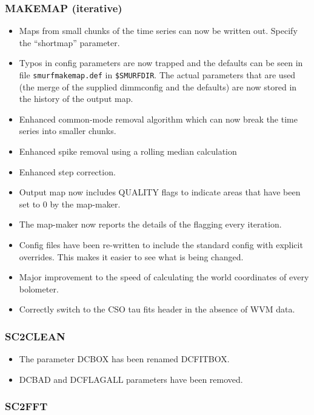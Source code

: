 \documentclass[twoside,11pt]{article}
\renewcommand{\_}{\texttt{\symbol{95}}}
\begin{document}
\subsubsection{MAKEMAP (iterative)}

\begin{itemize}
\item Maps from small chunks of the time series can now be written
  out. Specify the ``shortmap'' parameter.
\item Typos in config parameters are now trapped and the defaults can
  be seen in file \texttt{smurf\_makemap.def} in
  \texttt{\$SMURF\_DIR}. The actual parameters that are used (the
  merge of the supplied dimmconfig and the defaults) are now stored in
  the history of the output map.
\item Enhanced common-mode removal algorithm which can now break the
  time series into smaller chunks.
\item Enhanced spike removal using a rolling median calculation
\item Enhanced step correction.
\item Output map now includes QUALITY flags to indicate areas that
  have been set to 0 by the map-maker.
\item The map-maker now reports the details of the flagging every iteration.
\item Config files have been re-written to include the standard config
  with explicit overrides. This makes it easier to see what is being
  changed.
\item Major improvement to the speed of calculating the world
  coordinates of every bolometer.
\item Correctly switch to the CSO tau fits header in the absence of WVM data.
\end{itemize}

\subsubsection{SC2CLEAN}

\begin{itemize}
\item The parameter DCBOX has been renamed DCFITBOX.
\item DCBAD and DCFLAGALL parameters have been removed.
\end{itemize}

\subsubsection{SC2FFT}
\end{document}
